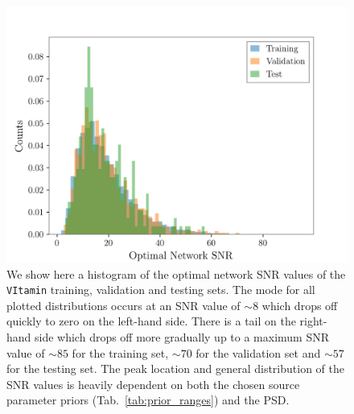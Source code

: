 \begin{figure}
    \includegraphics{figures/TrainingSetSNR_distribution.png}
    \caption[VItamin signal-to-noise ratio training, validation and testing set distributions.]{\label{fig:VItamin_TrainingSet_SNR_Dist} We show here a histogram of the optimal network \ac{SNR} values of the \texttt{VItamin} training, validation and testing sets. The mode for all 
    plotted distributions occurs at an \ac{SNR} value of $\sim8$ which drops off quickly to zero on the left-hand side. There is a tail on the right-hand side which drops off more gradually up to a maximum \ac{SNR} value of $\sim 85$ 
    for the training set, $\sim 70$ for the validation set and $\sim 57$ 
    for the testing set. The peak location and general distribution of the \ac{SNR} values is heavily dependent on both the chosen source parameter 
    priors (Tab.~\ref{tab:prior_ranges}) and the \ac{PSD}.}
\end{figure}

